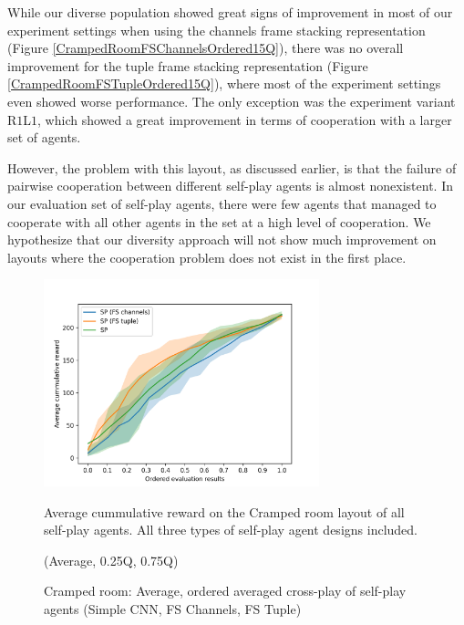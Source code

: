 While our diverse population showed great signs of improvement in most of our experiment settings when using the channels frame stacking representation (Figure \ref{CrampedRoomFSChannelsOrdered15Q}), there was no overall improvement for the tuple frame stacking representation (Figure \ref{CrampedRoomFSTupleOrdered15Q}), where most of the experiment settings even showed worse performance.
The only exception was the experiment variant R$1$L$1$, which showed a great improvement in terms of cooperation with a larger set of agents. 

However, the problem with this layout, as discussed earlier, is that the failure of pairwise cooperation between different self-play agents is almost nonexistent.
In our evaluation set of self-play agents, there were few agents that managed to cooperate with all other agents in the set at a high level of cooperation.
We hypothesize that our diversity approach will not show much improvement on layouts where the cooperation problem does not exist in the first place.



\begin{figure}[!ht]
    \centering
    \includegraphics*[width=8cm]{../img/CrampedRoomFSVariantsOrderedAvg.png}

    \caption{Cramped room: Average, ordered averaged cross-play of self-play agents (Simple CNN, FS Channels, FS Tuple)}
    \label{CrampedRoomFSVariantsOrderedAvg}
    \medskip
    \small 
    Average cummulative reward on the Cramped room layout of all self-play agents.
    All three types of self-play agent designs included.

    (Average, 0.25Q, 0.75Q)

\end{figure}


